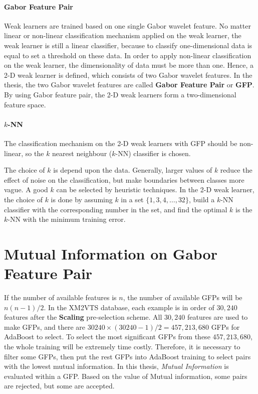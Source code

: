 \paragraph{Gabor Feature Pair}
Weak learners are trained based on one single Gabor wavelet feature. No matter linear or non-linear classification mechanism applied on the weak learner, the weak learner is still a linear classifier, because to classify one-dimensional data is equal to set a threshold on these data. In order to apply non-linear classification on the weak learner, the dimensionality of data must be more than one. Hence, a 2-D weak learner is defined, which consists of two Gabor wavelet features. In the thesis, the two Gabor wavelet features are called \textbf{Gabor Feature Pair} or \textbf{GFP}. By using Gabor feature pair, the 2-D weak learners form a two-dimensional feature space.

\paragraph{$k$-NN}
The classification mechanism on the 2-D weak learners with GFP should be non-linear, so the $k$ nearest neighbour ($k$-NN) classifier is chosen. 

The choice of $k$ is depend upon the data.  Generally, larger values of $k$ reduce the effect of noise on the classification, but make boundaries between classes more vague. A good $k$ can be selected by heuristic techniques. In the 2-D weak learner, the choice of $k$ is done by assuming $k$ in a set $\{1,3,4,\ldots,32\}$, build a $k$-NN classifier with the corresponding number in the set, and find the optimal $k$ is the $k$-NN with the minimum training error.


\section{Mutual Information on Gabor Feature Pair}
If the number of available features is $n$, the number of available GFPs will be $n(n-1)/2$. In the \mbox{XM2VTS} database, each example is in order of $30,240$ features after the \textbf{Scaling} pre-selection scheme. All $30,240$ features are used to make GFPs, and there are $30240\times (30240-1)/2=457,213,680$ GFPs for AdaBoost to select. To select the most significant GFPs from these $457,213,680$, the whole training will be extremely time costly. Therefore, it is necessary to filter some GFPs, then put the rest GFPs into AdaBoost training to select pairs with the lowest mutual information. In this thesis, \textit{Mutual Information} \cite{Peng2005,Shan2005} is evaluated within a GFP. Based on the value of Mutual information, some pairs are rejected, but some are accepted.


